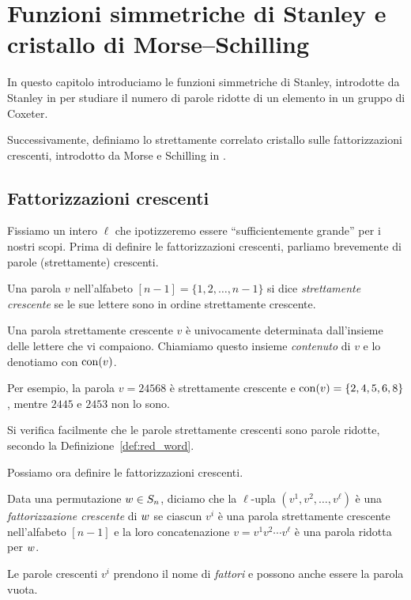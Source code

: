 
\chapter{Funzioni simmetriche di Stanley e cristallo di Morse--Schilling}
\label{ch:stanley_symm}

In questo capitolo introduciamo le funzioni simmetriche di Stanley,
introdotte da Stanley in \cite{stanley-84} per studiare il numero di parole ridotte
di un elemento in un gruppo di Coxeter.

Successivamente, definiamo lo strettamente correlato cristallo sulle 
fattorizzazioni crescenti, introdotto da Morse e Schilling in
\cite[Section~3]{morse-schilling-15}.

\section{Fattorizzazioni crescenti}
\label{sec:incr_fact}

Fissiamo un intero $\ell$ che ipotizzeremo essere ``sufficientemente grande''
per i nostri scopi.
Prima di definire le fattorizzazioni crescenti, parliamo brevemente
di parole (strettamente) crescenti.

\begin{definition}
    \label{def:incr_word}
    Una parola $v$ nell'alfabeto $[n-1] = \{1, 2, \dots, n-1\}$ si dice
    \emph{strettamente crescente} se le sue lettere sono in ordine strettamente
    crescente.

    Una parola strettamente crescente $v$ \`e univocamente determinata dall'insieme delle lettere
    che vi compaiono.
    Chiamiamo questo insieme \emph{contenuto} di $v$ e lo denotiamo
    con $\operatorname{con}(v)$.
\end{definition}

Per esempio, la parola $v = 24568$ \`e strettamente crescente e 
$\operatorname{con}(v) = \{2, 4, 5, 6, 8\}$, mentre $2445$ e $2453$ non lo sono.

\begin{remark}
    Si verifica facilmente che le parole strettamente crescenti sono
    parole ridotte, secondo la Definizione~\ref{def:red_word}.
\end{remark}

Possiamo ora definire le fattorizzazioni crescenti.

\begin{definition}
    Data una permutazione $w \in S_n$, diciamo che la $\ell$-upla 
    $( v^1, v^2 , \dots , v^\ell )$ \`e una \emph{fattorizzazione crescente} di 
    $w$ se ciascun $v^i$ \`e una parola strettamente crescente nell'alfabeto
    $[n-1]$ e la loro concatenazione $v = v^1 v^2 \cdots v^\ell$
    \`e una parola ridotta per $w$.

    Le parole crescenti $v^i$ prendono il nome di \emph{fattori} e possono anche 
    essere la parola vuota.
\end{definition}

